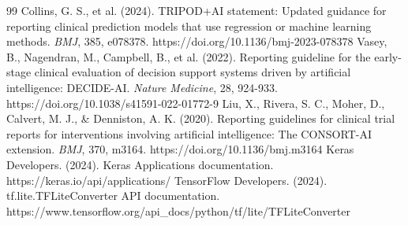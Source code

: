 \documentclass[11pt,a4paper]{article}
\begin{document}
\begin{thebibliography}{99}
 Collins, G. S., et al. (2024). TRIPOD+AI statement: Updated guidance for reporting clinical prediction models that use regression or machine learning methods. \textit{BMJ}, 385, e078378. https://doi.org/10.1136/bmj-2023-078378
 Vasey, B., Nagendran, M., Campbell, B., et al. (2022). Reporting guideline for the early-stage clinical evaluation of decision support systems driven by artificial intelligence: DECIDE-AI. \textit{Nature Medicine}, 28, 924-933. https://doi.org/10.1038/s41591-022-01772-9
 Liu, X., Rivera, S. C., Moher, D., Calvert, M. J., \& Denniston, A. K. (2020). Reporting guidelines for clinical trial reports for interventions involving artificial intelligence: The CONSORT-AI extension. \textit{BMJ}, 370, m3164. https://doi.org/10.1136/bmj.m3164
 Keras Developers. (2024). Keras Applications documentation. https://keras.io/api/applications/
 TensorFlow Developers. (2024). tf.lite.TFLiteConverter API documentation. https://www.tensorflow.org/api\_docs/python/tf/lite/TFLiteConverter
\end{thebibliography}
\end{document}
